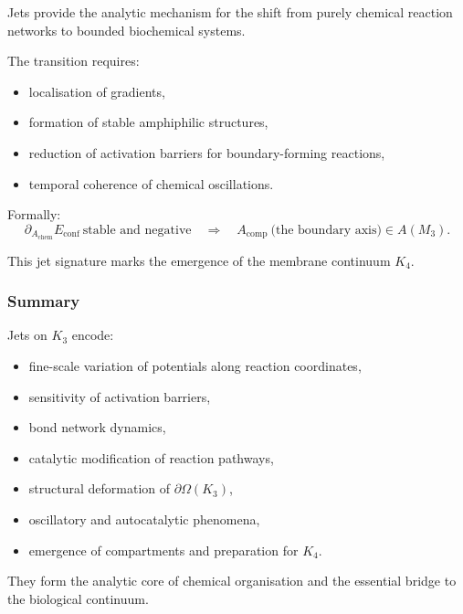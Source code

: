 Jets provide the analytic mechanism for the shift from purely chemical
reaction networks to bounded biochemical systems.

The transition requires:

\begin{itemize}
    \item localisation of gradients,
    \item formation of stable amphiphilic structures,
    \item reduction of activation barriers for boundary-forming reactions,
    \item temporal coherence of chemical oscillations.
\end{itemize}

Formally:
\[
\partial_{A_{\mathrm{chem}}}E_{\mathrm{conf}}
\ \text{stable and negative}
\quad\Longrightarrow\quad
A_{\mathrm{comp}}\ \text{(the boundary axis)}\in A(M_3).
\]

This jet signature marks the emergence of the membrane continuum $K_4$.



\subsubsection{Summary}

Jets on $K_3$ encode:

\begin{itemize}
    \item fine-scale variation of potentials along reaction coordinates,
    \item sensitivity of activation barriers,
    \item bond network dynamics,
    \item catalytic modification of reaction pathways,
    \item structural deformation of $\partial\Omega(K_3)$,
    \item oscillatory and autocatalytic phenomena,
    \item emergence of compartments and preparation for $K_4$.
\end{itemize}

They form the analytic core of chemical organisation and the essential
bridge to the biological continuum.
